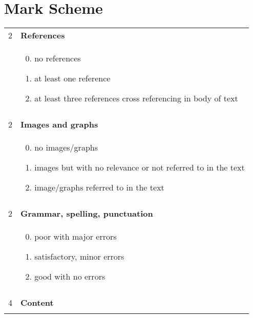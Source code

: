 \documentclass[12pt]{article}
\begin{document}
\newpage

\section*{Mark Scheme}
\begin{tabular}{cl}
2 & \textbf{References}\\
& \hspace*{3em}\begin{minipage}{0.7\textwidth}
\begin{enumerate}[1 ]\setcounter{enumi}{-1}
\item no references
\item at least one reference
\item at least three references cross referencing in body of text
\end{enumerate}
\end{minipage} \\
\\
2 & \textbf{Images and graphs}\\
& \hspace*{3em}\begin{minipage}{0.7\textwidth}
\begin{enumerate}[1 ]\setcounter{enumi}{-1}
\item no images/graphs
\item images but with no relevance or not referred to in the text
\item image/graphs referred to in the text
\end{enumerate}
\end{minipage} \\
\\
2 & \textbf{Grammar, spelling, punctuation}\\
& \hspace*{3em}\begin{minipage}{0.7\textwidth}
\begin{enumerate}[1 ]\setcounter{enumi}{-1}
\item poor with major errors
\item satisfactory, minor errors
\item good with no errors
\end{enumerate}
\end{minipage} \\
\\
4 & \textbf{Content}\\
& \hspace*{3em}\begin{minipage}{0.7\textwidth}

\end{minipage}
\end{tabular}
\end{document}
